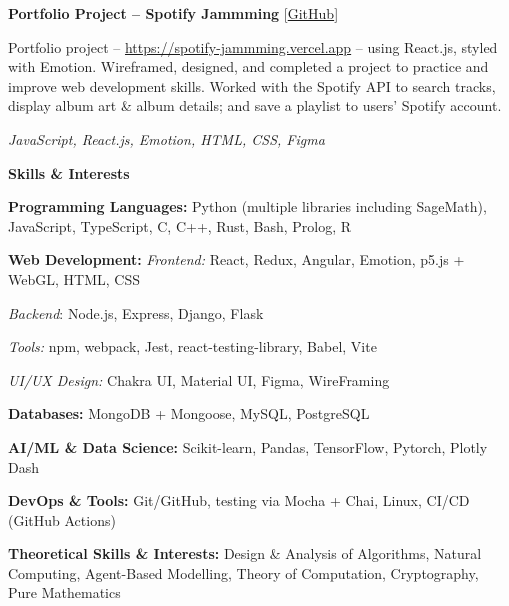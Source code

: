 \documentclass[12pt, a4paper]{article}
\begin{document}
\textbf{Portfolio Project -- Spotify Jammming} \hfill [\href{https://github.com/m-usaid99/spotify-jammming}{GitHub}]
\begin{center}
	\parbox{0.9\linewidth}{
		Portfolio project -- \url{https://spotify-jammming.vercel.app} -- using React.js, styled with Emotion. Wireframed, designed, and completed a project to practice and improve web development skills. Worked with the Spotify API to search tracks, display album art \& album details; and save a playlist to users' Spotify account.

		\textit{JavaScript, React.js, Emotion, HTML, CSS, Figma}
	}
\end{center}

\newpage
\begin{center}
	\large\textbf{Skills \& Interests}
\end{center}

\textbf{Programming Languages:} Python (multiple libraries including SageMath), JavaScript, TypeScript, C, C++, Rust, Bash, Prolog, R

\textbf{Web Development:} \textit{Frontend:} React, Redux, Angular, Emotion, p5.js + WebGL, HTML, CSS 

\textit{Backend}: Node.js, Express, Django, Flask 

\textit{Tools:} npm, webpack, Jest, react-testing-library, Babel, Vite 

\textit{UI/UX Design:} Chakra UI, Material UI, Figma, WireFraming

\textbf{Databases:} MongoDB + Mongoose, MySQL, PostgreSQL

\textbf{AI/ML \& Data Science:} Scikit-learn, Pandas, TensorFlow, Pytorch, Plotly Dash

\textbf{DevOps \& Tools:} Git/GitHub, testing via Mocha + Chai, Linux, CI/CD (GitHub Actions)

\textbf{Theoretical Skills \& Interests:} Design \& Analysis of Algorithms, Natural Computing, Agent-Based Modelling, Theory of Computation, Cryptography, Pure Mathematics
\end{document}
